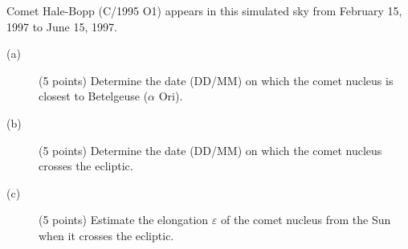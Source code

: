 Comet Hale-Bopp (C/1995 O1) appears in this simulated sky from February 15,
1997 to June 15, 1997.

\begin{description}
\item[(a)] (5 points) Determine the date (DD/MM) on which the comet nucleus is
  closest to Betelgeuse ($\alpha$ Ori).
\item[(b)] (5 points) Determine the date (DD/MM) on which the comet nucleus
  crosses the ecliptic.
\item[(c)] (5 points) Estimate the elongation $\varepsilon$ of the comet
  nucleus from the Sun when it crosses the ecliptic.
\end{description}
